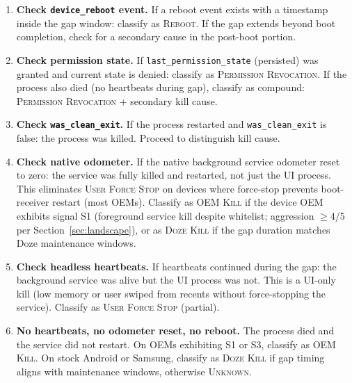 \documentclass[10pt,journal,compsoc]{IEEEtran}
\begin{document}
\begin{enumerate}
  \item \textbf{Check \texttt{device\_reboot} event.} If a reboot event
        exists with a timestamp inside the gap window: classify as
        \textsc{Reboot}. If the gap extends beyond boot completion,
        check for a secondary cause in the post-boot portion.

  \item \textbf{Check permission state.} If
        \texttt{last\_permission\_state} (persisted) was granted and
        current state is denied: classify as
        \textsc{Permission Revocation}. If the process also died (no
        heartbeats during gap), classify as compound:
        \textsc{Permission Revocation} + secondary kill cause.

  \item \textbf{Check \texttt{was\_clean\_exit}.} If the process
        restarted and \texttt{was\_clean\_exit} is false: the process
        was killed. Proceed to distinguish kill cause.

  \item \textbf{Check native odometer.} If the native background service
        odometer reset to zero: the service was fully killed and
        restarted, not just the UI process. This eliminates
        \textsc{User Force Stop} on devices where force-stop prevents
        boot-receiver restart (most OEMs). Classify as \textsc{OEM Kill}
        if the device OEM exhibits signal S1 (foreground service kill
        despite whitelist; aggression $\geq$4/5 per
        Section~\ref{sec:landscape}), or as \textsc{Doze Kill} if the
        gap duration matches Doze maintenance windows.

  \item \textbf{Check headless heartbeats.} If heartbeats continued
        during the gap: the background service was alive but the UI
        process was not. This is a UI-only kill (low memory or user
        swiped from recents without force-stopping the service).
        Classify as \textsc{User Force Stop} (partial).

  \item \textbf{No heartbeats, no odometer reset, no reboot.} The
        process died and the service did not restart. On OEMs exhibiting
        S1 or S3, classify as \textsc{OEM Kill}. On stock Android or Samsung,
        classify as \textsc{Doze Kill} if gap timing aligns with
        maintenance windows, otherwise \textsc{Unknown}.
\end{enumerate}
\end{document}
